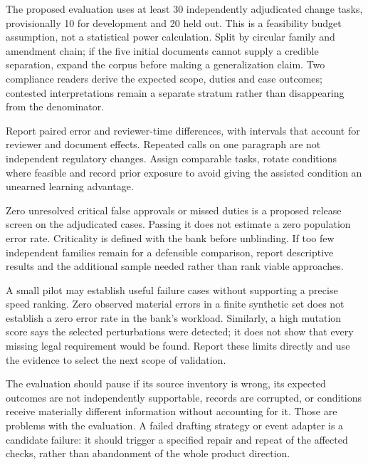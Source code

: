 The proposed evaluation uses at least 30 independently adjudicated change tasks, provisionally
10 for development and 20 held out. This is a feasibility budget assumption,
not a statistical power calculation. Split by circular family and amendment
chain; if the five initial documents cannot supply a credible separation, expand
the corpus before making a generalization claim. Two compliance readers derive
the expected scope, duties and case outcomes; contested interpretations remain
a separate stratum rather than disappearing from the denominator.

Report paired error and reviewer-time differences, with intervals that account
for reviewer and document effects. Repeated calls on one paragraph are not
independent regulatory changes. Assign comparable tasks, rotate conditions where
feasible and record prior exposure to avoid giving the assisted condition an
unearned learning advantage.


Zero unresolved critical false approvals or missed duties is a proposed release
screen on the adjudicated cases. Passing it does not estimate a zero population
error rate. Criticality is defined with the bank before unblinding. If too few
independent families remain for a defensible comparison, report descriptive
results and the additional sample needed rather than rank viable approaches.

A small pilot may establish useful failure cases without supporting a precise
speed ranking. Zero observed material errors in a finite synthetic set does not
establish a zero error rate in the bank's workload. Similarly, a high mutation
score says the selected perturbations were detected; it does not show that every
missing legal requirement would be found. Report these limits directly and use
the evidence to select the next scope of validation.

The evaluation should pause if its source inventory is wrong, its expected
outcomes are not independently supportable, records are corrupted, or conditions
receive materially different information without accounting for it. Those are
problems with the evaluation. A failed drafting strategy or event adapter is a
candidate failure: it should trigger a specified repair and repeat of the affected
checks, rather than abandonment of the whole product direction.

